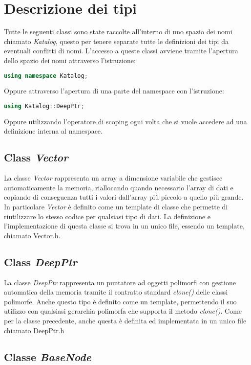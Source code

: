 \section{Descrizione dei tipi}

Tutte le seguenti classi sono state raccolte all'interno di uno spazio
dei nomi chiamato \emph{Katalog}, questo per tenere separate tutte
le definizioni dei tipi da eventuali conflitti di nomi. L'accesso 
a queste classi avviene tramite l'apertura dello spazio dei nomi attraverso
l'istruzione:
\begin{lstlisting}[language=C++]
    using namespace Katalog;
\end{lstlisting}
Oppure attraverso l'apertura di una parte del namespace con l'istruzione:
\begin{lstlisting}[language=C++]
    using Katalog::DeepPtr;
\end{lstlisting}
Oppure utilizzando l'operatore di scoping ogni volta che si vuole accedere
ad una definizione interna al namespace.

\subsection{Class \emph{Vector}}

La classe \emph{Vector} rappresenta un array a dimensione variabile che
gestisce automaticamente la memoria, riallocando quando necessario
l'array di dati e copiando di conseguenza tutti i valori dall'array
più piccolo a quello più grande. In particolare \emph{Vector} è definito
come un template di classe che permette di riutilizzare lo stesso codice
per qualsiasi tipo di dati. La definizione e l'implementazione di questa 
classe si trova in un unico file, essendo un template, chiamato Vector.h.

\subsection{Class \emph{DeepPtr}}

La classe \emph{DeepPtr} rappresenta un puntatore ad oggetti polimorfi
con gestione automatica della memoria tramite il contratto standard
\emph{clone()} delle classi polimorfe. Anche questo tipo è definito come
un template, permettendo il suo utilizzo con qualsiasi gerarchia polimorfa
che supporta il metodo \emph{clone()}. Come per la classe precedente, anche 
questa è definita ed implementata in un unico file chiamato DeepPtr.h

\subsection{Classe \emph{BaseNode}}

